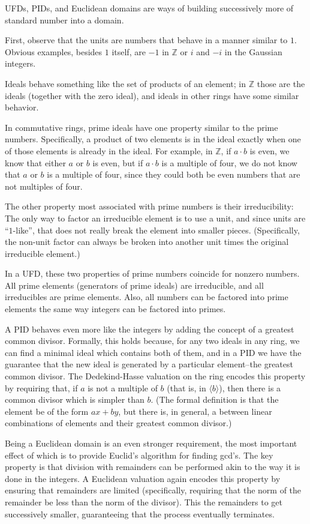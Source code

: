 \documentclass[12pt]{article}
\begin{document}

UFDs, PIDs, and Euclidean domains are ways of building successively more of standard number  into a domain.

First, observe that the units are numbers that behave in a manner similar to $1$.  Obvious examples, besides $1$ itself, are $-1$ in $\mathbb{Z}$ or $i$ and $-i$ in the Gaussian integers.

Ideals behave something like the set of products of an element; in $\mathbb{Z}$ those are the ideals (together with the zero ideal), and ideals in other rings have some similar behavior.

In commutative rings, prime ideals have one property similar to the prime numbers.  Specifically, a product of two elements is in the ideal exactly when one of those elements is already in the ideal.  For example, in $\mathbb{Z}$, if $a\cdot b$ is even, we know that either $a$ or $b$ is even, but if $a\cdot b$ is a multiple of four, we do not know that $a$ or $b$ is a multiple of four, since they could both be even numbers that are not multiples of four.

The other property most associated with prime numbers is their irreducibility:  The only way to factor an irreducible element is to use a unit, and since units are ``$1$-like'', that does not really break the element into smaller pieces.  (Specifically, the non-unit factor can always be broken into another unit times the original irreducible element.)

In a UFD, these two properties of prime numbers coincide for nonzero numbers.  All prime elements (generators of prime ideals) are irreducible, and all irreducibles are prime elements.  Also, all numbers can be factored into prime elements the same way integers can be factored into primes.

A PID behaves even more like the integers by adding the concept of a greatest common divisor.  Formally, this holds because, for any two ideals in any ring, we can find a minimal ideal which contains both of them, and in a PID we have the guarantee that the new ideal is generated by a particular element--the greatest common divisor.  The Dedekind-Hasse valuation on the ring encodes this property by requiring that, if $a$ is not a multiple of $b$ (that is, in $\langle b \rangle$), then there is a common divisor which is simpler than $b$.  (The formal definition is that the element be of the form $ax+by$, but there is, in general, a  between linear combinations of elements and their greatest common divisor.)

Being a Euclidean domain is an even stronger requirement, the most important effect of which is to provide Euclid's algorithm for finding gcd's.  The key property is that division with remainders can be performed akin to the way it is done in the integers.  A Euclidean valuation again encodes this property by ensuring that remainders are limited (specifically, requiring that the norm of the remainder be less than the norm of the divisor).  This  the remainders to get successively smaller, guaranteeing that the process eventually terminates.
\end{document}
